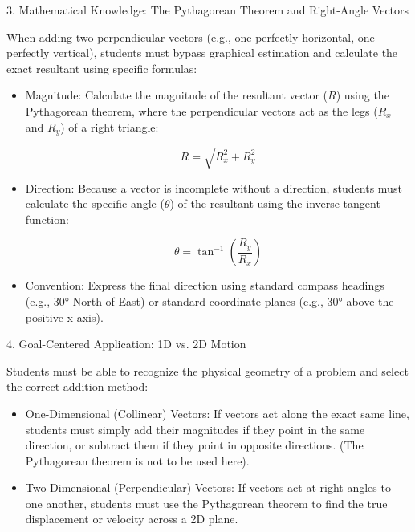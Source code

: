 \documentclass[]{article}
\begin{document}
3. Mathematical Knowledge: The Pythagorean Theorem and Right-Angle Vectors


When adding two perpendicular vectors (e.g., one perfectly horizontal, one perfectly vertical), students must bypass graphical estimation and calculate the exact resultant using specific formulas:

\begin{itemize}[itemsep=0pt,topsep=0pt]
    \item  Magnitude: Calculate the magnitude of the resultant vector ($R$) using the Pythagorean theorem, where the perpendicular vectors act as the legs ($R_x$ and $R_y$) of a right triangle:

    \begin{equation*}
        R = \sqrt{R_x^2 + R_y^2}
    \end{equation*}

    \item Direction: Because a vector is incomplete without a direction, students must calculate the specific angle ($\theta$) of the resultant using the inverse tangent function:

    \begin{equation*}
        \theta = \tan^{-1}\left(\frac{R_y}{R_x}\right)
    \end{equation*}

    \item Convention: Express the final direction using standard compass headings (e.g., \ang{30} North of East) or standard coordinate planes (e.g., \ang{30} above the positive x-axis).
\end{itemize}

4. Goal-Centered Application: 1D vs. 2D Motion

Students must be able to recognize the physical geometry of a problem and select the correct addition method:

\begin{itemize}[itemsep=0pt,topsep=0pt]
    \item  One-Dimensional (Collinear) Vectors: If vectors act along the exact same line, students must simply add their magnitudes if they point in the same direction, or subtract them if they point in opposite directions. (The Pythagorean theorem is not to be used here).
    \item Two-Dimensional (Perpendicular) Vectors: If vectors act at right angles to one another, students must use the Pythagorean theorem to find the true displacement or velocity across a 2D plane.
\end{itemize}
\end{document}
